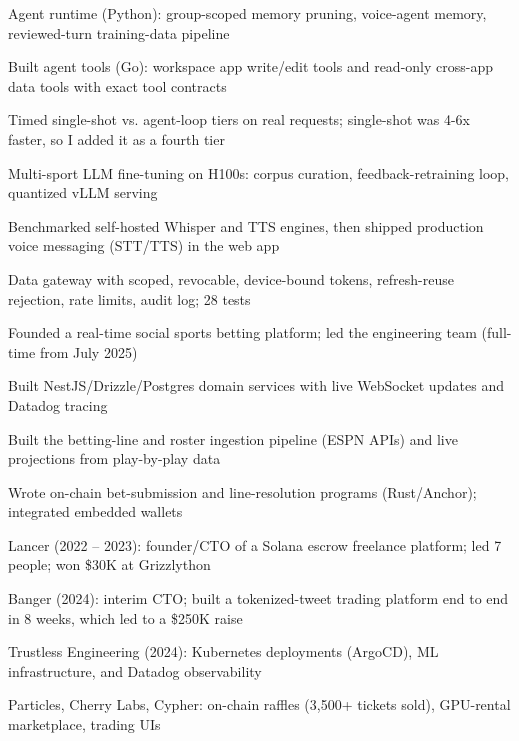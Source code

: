 \documentclass[print]{jack-resume}
\begin{document}
\begin{tightemize}
    \item Agent runtime (Python): group-scoped memory pruning, voice-agent memory, reviewed-turn training-data pipeline
    \item Built agent tools (Go): workspace app write/edit tools and read-only cross-app data tools with exact tool contracts
    \item Timed single-shot vs. agent-loop tiers on real requests; single-shot was 4-6x faster, so I added it as a fourth tier
    \item Multi-sport LLM fine-tuning on H100s: corpus curation, feedback-retraining loop, quantized vLLM serving
    \item Benchmarked self-hosted Whisper and TTS engines, then shipped production voice messaging (STT/TTS) in the web app
    \item Data gateway with scoped, revocable, device-bound tokens, refresh-reuse rejection, rate limits, audit log; 28 tests
\end{tightemize}
\sectionsep

\begin{tightemize}
    \item Founded a real-time social sports betting platform; led the engineering team (full-time from July 2025)
    \item Built NestJS/Drizzle/Postgres domain services with live WebSocket updates and Datadog tracing
    \item Built the betting-line and roster ingestion pipeline (ESPN APIs) and live projections from play-by-play data
    \item Wrote on-chain bet-submission and line-resolution programs (Rust/Anchor); integrated embedded wallets
\end{tightemize}
\sectionsep

\begin{tightemize}
    \item Lancer (2022 – 2023): founder/CTO of a Solana escrow freelance platform; led 7 people; won \$30K at Grizzlython
    \item Banger (2024): interim CTO; built a tokenized-tweet trading platform end to end in 8 weeks, which led to a \$250K raise
    \item Trustless Engineering (2024): Kubernetes deployments (ArgoCD), ML infrastructure, and Datadog observability
    \item Particles, Cherry Labs, Cypher: on-chain raffles (3,500+ tickets sold), GPU-rental marketplace, trading UIs
\end{tightemize}
\sectionsep
\end{document}
